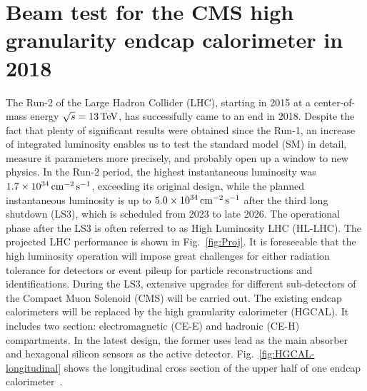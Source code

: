 \chapter{Beam test for the CMS high granularity endcap calorimeter in 2018}
\label{sec:Appendix_HGCAL}

The Run-2 of the Large Hadron Collider (LHC), starting in 2015 at a center-of-mass energy $\sqrt{s}=13\,\text{Te\hspace{-.08em}V}$, has successfully came to an end in 2018. Despite the fact that plenty of significant results were obtained since the Run-1, an increase of integrated luminosity enables us to test the standard model (SM) in detail, measure it parameters more precisely, and probably open up a window to new physics.
In the Run-2 period, the highest instantaneous luminosity was $1.7\times \text{10}^\text{34}\text{\,cm}^{-2}\text{\,s}^{-1}$, exceeding its original design, while the planned instantaneous luminosity is up to $5.0\times \text{10}^\text{34}\text{\,cm}^{-2}\text{\,s}^{-1}$ after the third long shutdown (LS3), which is scheduled from 2023 to late 2026. The operational phase after the LS3 is often referred to as High Luminosity LHC (HL-LHC). The projected LHC performance is shown in Fig.~\ref{fig:Proj}.
It is foreseeable that the high luminosity operation will impose great challenges for either radiation tolerance for detectors or event pileup for particle reconstructions and identifications\footnotemark. During the LS3, extensive upgrades for different sub-detectors of the Compact Muon Solenoid (CMS) will be carried out. The existing endcap calorimeters will be replaced by the high granularity calorimeter (HGCAL). It includes two section: electromagnetic (CE-E) and hadronic (CE-H) compartments. In the latest design, the former uses lead as the main absorber and hexagonal silicon sensors as the active detector. Fig.~\ref{fig:HGCAL-longitudinal} shows the longitudinal cross section of the upper half of one endcap calorimeter~\cite{Collaboration:2293646}.


